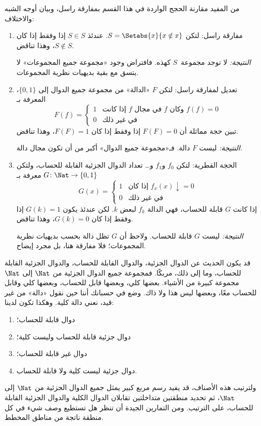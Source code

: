 \documentclass[../../../include/open-logic-section]{subfiles}
\begin{document}

من المفيد مقارنة الحجج الواردة في هذا القسم بمفارقة راسل، وبيان أوجه
الشبه والاختلاف:
\begin{enumerate}
\item مفارقة راسل: لتكن $S=\Setabs{x}{x\notin x}$. عندئذ
$S\in S$ إذا وفقط إذا كان $S\notin S$، وهذا تناقض.

  \emph{النتيجة:} لا توجد مجموعة~$S$ كهذه. فافتراض وجود «مجموعة جميع
  المجموعات» لا يتسق مع بقية بديهيات نظرية المجموعات.

\item تعديل لمفارقة راسل: لتكن $F$ «الدالة» من مجموعة جميع الدوال إلى
$\{0,1\}$، المعرفة بـ
  \[
  F(f) =
  \begin{cases}
    1 & \text{إذا كانت $f$ في مجال $f$ وكان $f(f) = 0$} \\
    0 & \text{في غير ذلك}
  \end{cases}
  \]
  تبين حجة مماثلة أن $F(F)=0$ إذا وفقط إذا كان $F(F)=1$، وهذا تناقض.

  \emph{النتيجة:} ليست $F$ دالة. فـ«مجموعة جميع الدوال» أكبر من أن
  تكون مجال دالة.

\item الحجة القطرية: لتكن $f_0$ و$f_1$ و… تعداد الدوال الجزئية
  القابلة للحساب، ولتكن $G\colon\Nat\to\{0,1\}$ معرفة بـ
  \[
  G(x) =
  \begin{cases}
    1 & \text{إذا كان $f_x(x)\downarrow = 0$} \\
    0 & \text{في غير ذلك}
  \end{cases}
  \]
  إذا كانت $G$ قابلة للحساب، فهي الدالة $f_k$ لبعض $k$. لكن عندئذ
  يكون $G(k)=1$ إذا وفقط إذا كان $G(k)=0$، وهذا تناقض.

  \emph{النتيجة:} ليست $G$ قابلة للحساب. ولاحظ أن $G$ تظل دالة بحسب
  بديهيات نظرية المجموعات؛ فلا مفارقة هنا، بل مجرد إيضاح.
\end{enumerate}

قد يكون الحديث عن الدوال الجزئية، والدوال القابلة للحساب، والدوال
الجزئية القابلة للحساب، وما إلى ذلك، مربكًا. فمجموعة جميع الدوال
الجزئية من $\Nat$ إلى $\Nat$ مجموعة كبيرة من الأشياء. بعضها كلي،
وبعضها قابل للحساب، وبعضها كلي وقابل للحساب معًا، وبعضها ليس هذا ولا
ذاك. وضع في حسبانك أننا حين نقول «دالة» من غير قيد، نعني دالة كلية.
وهكذا تكون لدينا:
\begin{enumerate}
\item دوال قابلة للحساب؛
\item دوال جزئية قابلة للحساب وليست كلية؛
\item دوال غير قابلة للحساب؛
\item دوال جزئية ليست كلية ولا قابلة للحساب.
\end{enumerate}
ولترتيب هذه الأصناف، قد يفيد رسم مربع كبير يمثل جميع الدوال الجزئية من
$\Nat$ إلى $\Nat$، ثم تحديد منطقتين متداخلتين تقابلان الدوال الكلية
والدوال الجزئية القابلة للحساب، على الترتيب. ومن التمارين الجيدة أن
تنظر هل تستطيع وصف شيء في كل منطقة ناتجة من مناطق المخطط.
\end{document}
